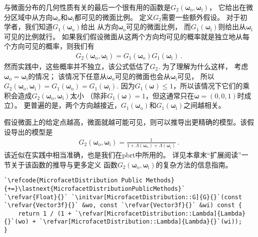 与微面分布的几何性质有关的最后一个很有用的函数是$G_2({\bm\omega}_{\mathrm{o}},{\bm\omega}_{\mathrm{i}})$，
它给出在微分区域中从方向${\bm\omega}_{\mathrm{o}}$和${\bm\omega}_{\mathrm{i}}$都可见的微面比例。
定义$G_2$需要一些额外假设。
对于初学者，我们知道$G_1({\bm\omega}_{\mathrm{o}})$给出
从方向${\bm\omega}_{\mathrm{o}}$可见的微面比例，
而$G_1({\bm\omega}_{\mathrm{i}})$则给出从${\bm\omega}_{\mathrm{i}}$可见的比例就行。
如果我们假设微面从这两个方向均可见的概率就是独立地从每个方向可见的概率，则我们有
\begin{align*}
    G_2({\bm\omega}_{\mathrm{o}},{\bm\omega}_{\mathrm{i}})=G_1({\bm\omega}_{\mathrm{o}})G_1({\bm\omega}_{\mathrm{i}})\, .
\end{align*}
然而实践中，这些概率并不独立，该公式低估了$G_2$. 为了理解为什么这样，
考虑${\bm\omega}_{\mathrm{o}}={\bm\omega}_{\mathrm{i}}$的情况；
该情况下任意从${\bm\omega}_{\mathrm{o}}$可见的微面也会从${\bm\omega}_{\mathrm{i}}$可见，
所以$G_2({\bm\omega}_{\mathrm{o}},{\bm\omega}_{\mathrm{i}})=G_1({\bm\omega}_{\mathrm{o}})=G_1({\bm\omega}_{\mathrm{i}})$.
因为$G_1({\bm\omega})\le 1$，所以该情况下它们的乘积会造成$G_2({\bm\omega}_{\mathrm{o}},{\bm\omega}_{\mathrm{i}})$太小
（除非$G_1({\bm\omega})=1$，但这通常只在${\bm\omega}=(0,0,1)$时成立）。
更普遍的是，两个方向越接近，$G_1({\bm\omega}_{\mathrm{o}})$和$G_1({\bm\omega}_{\mathrm{i}})$之间越相关。

假设微面上的给定点越高，微面就越可能可见，则可以推导出更精确的模型。该假设导出的模型是
\begin{align*}
    G_2({\bm\omega}_{\mathrm{o}},{\bm\omega}_{\mathrm{i}})=\frac{1}{1+\Lambda({\bm\omega}_{\mathrm{o}})+\Lambda({\bm\omega}_{\mathrm{i}})}\, .
\end{align*}
该近似在实践中相当准确，也是我们在pbrt中所用的。
详见本章末“扩展阅读”一节关于该函数的推导与更多定义
函数$G_2({\bm\omega}_{\mathrm{o}},{\bm\omega}_{\mathrm{i}})$的复杂方法的信息指南。
\begin{lstlisting}
`\refcode{MicrofacetDistribution Public Methods}{+=}\lastnext{MicrofacetDistributionPublicMethods}`
`\refvar{Float}{}` `\initvar[MicrofacetDistribution::G]{G}{}`(const `\refvar{Vector3f}{}` &wo, const `\refvar{Vector3f}{}` &wi) const {
    return 1 / (1 + `\refvar[MicrofacetDistribution::Lambda]{Lambda}{}`(wo) + `\refvar[MicrofacetDistribution::Lambda]{Lambda}{}`(wi));
}
\end{lstlisting}

